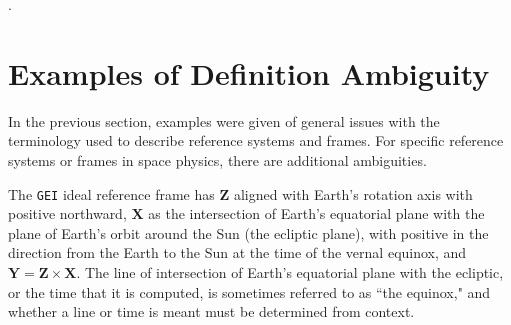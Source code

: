 \documentclass[draft]{agujournal2019}
\begin{document}

.

\section{Examples of Definition Ambiguity}
\label{sect:definitions}

In the previous section, examples were given of general issues with the terminology used to describe reference systems and frames. For specific reference systems or frames in space physics, there are additional ambiguities.

 The \texttt{GEI} ideal reference frame has $\mathbf{Z}$ aligned with Earth's rotation axis with positive northward, $\mathbf{X}$ as the intersection of Earth's equatorial plane with the plane of Earth's orbit around the Sun (the ecliptic plane), with positive in the direction from the Earth to the Sun at the time of the vernal equinox, and $\mathbf{Y}=\mathbf{Z}\times\mathbf{X}$. The line of intersection of Earth's equatorial plane with the ecliptic, or the time that it is computed, is sometimes referred to as ``the equinox," and whether a line or time is meant must be determined from context.
\end{document}
